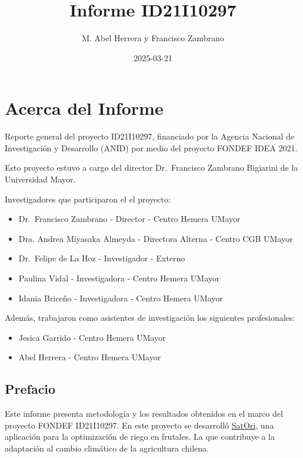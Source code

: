 \documentclass[
  letterpaper,
  DIV=11,
  numbers=noendperiod]{scrreprt}
\title{Informe ID21I10297}
\author{M. Abel Herrera y Francisco Zambrano}
\date{2025-03-21}
\providecommand{\tightlist}{%
  \setlength{\itemsep}{0pt}\setlength{\parskip}{0pt}}\usepackage{longtable,booktabs,array}
\renewcommand*\contentsname{Tabla de contenidos}
\newcommand\contentsname{Tabla de contenidos}
\begin{document}
\maketitle

\renewcommand*\contentsname{Tabla de contenidos}
{
\hypersetup{linkcolor=}
\setcounter{tocdepth}{2}
\tableofcontents
}

\part{Acerca del Informe}

Reporte general del proyecto ID21I10297, financiado por la Agencia
Nacional de Investigación y Desarrollo (ANID) por medio del proyecto
FONDEF IDEA 2021.

Esto proyecto estuvo a cargo del director Dr.~Francisco Zambrano
Bigiarini de la Universidad Mayor.

Investigadores que participaron el el proyecto:

\begin{itemize}
\tightlist
\item
  Dr.~Francisco Zambrano - Director - Centro Hemera UMayor
\item
  Dra. Andrea Miyasaka Almeyda - Directora Alterna - Centro CGB UMayor
\item
  Dr.~Felipe de La Hoz - Investigador - Externo
\item
  Paulina Vidal - Investigadora - Centro Hemera UMayor
\item
  Idania Briceño - Investigadora - Centro Hemera UMayor
\end{itemize}

Además, trabajaron como asistentes de investigación los siguientes
profesionales:

\begin{itemize}
\tightlist
\item
  Jesica Garrido - Centro Hemera UMayor
\item
  Abel Herrera - Centro Hemera UMayor
\end{itemize}


\chapter*{Prefacio}\label{prefacio}


Este informe presenta metodología y los resultados obtenidos en el marco
del proyecto FONDEF ID21I10297. En este proyecto se desarrolló
\href{https://s4tori.cl}{SatOri}, una aplicación para la optimización de
riego en frutales. La que contribuye a la adaptación al cambio climático
de la agricultura chilena.
\end{document}
